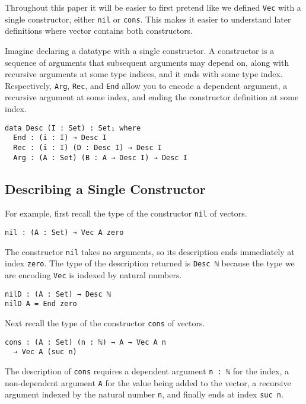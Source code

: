 \documentclass[preprint,nonatbib]{sigplanconf}
\begin{document}
Throughout this paper it will be easier to first pretend like we
defined {\tt Vec} with a single constructor, either
{\tt nil} or {\tt cons}. This makes it easier to understand
later definitions where vector contains both constructors.

Imagine declaring a datatype with a single constructor.
A constructor is a sequence of
arguments that subsequent arguments may depend on, along with
recursive arguments at some type indices, and it ends with some type index.
Respectively, {\tt Arg}, {\tt Rec}, and {\tt End} allow you to encode
a dependent argument, a recursive argument at some index, and ending the
constructor definition at some index.

\begin{verbatim}
data Desc (I : Set) : Set₁ where
  End : (i : I) → Desc I
  Rec : (i : I) (D : Desc I) → Desc I
  Arg : (A : Set) (B : A → Desc I) → Desc I
\end{verbatim}

\subsection{Describing a Single Constructor}

For example, first recall the type of the
constructor {\tt nil} of vectors.

\begin{verbatim}
nil : (A : Set) → Vec A zero
\end{verbatim}

The constructor {\tt nil} takes no arguments, so its description
ends immediately at index {\tt zero}. The type of the description
returned is {\tt Desc ℕ} because the type we are encoding {\tt Vec}
is indexed by natural numbers.

\begin{verbatim}
nilD : (A : Set) → Desc ℕ
nilD A = End zero
\end{verbatim}

Next recall the type of the
constructor {\tt cons} of vectors.

\begin{verbatim}
cons : (A : Set) (n : ℕ) → A → Vec A n
  → Vec A (suc n)
\end{verbatim}

The description of {\tt cons} requires a dependent argument
{\tt n : ℕ} for the index, a non-dependent argument {\tt A} for the value
being added to the vector, a recursive argument indexed by the
natural number {\tt n}, and finally ends at index {\tt suc n}.
\end{document}
